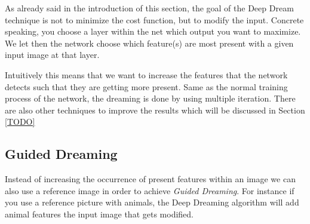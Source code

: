 As already said in the introduction of this section, the goal of the Deep Dream technique is not to minimize the cost function, but to modify the input.
Concrete speaking, you choose a layer within the net which output you want to maximize.
We let then the network choose which feature(s) are most present with a given input image at that layer.


Intuitively this means that we want to increase the features that the network detects such that they are getting more present.
Same as the normal training process of the network, the dreaming is done by using multiple iteration.
There are also other techniques to improve the results which will be discussed in Section \ref{TODO}










\subsection{Guided Dreaming}
Instead of increasing the occurrence of present features within an image we can also use a reference image in order to achieve \emph{Guided Dreaming}.
For instance if you use a reference picture with animals, the Deep Dreaming algorithm will add animal features the input image that gets modified.
